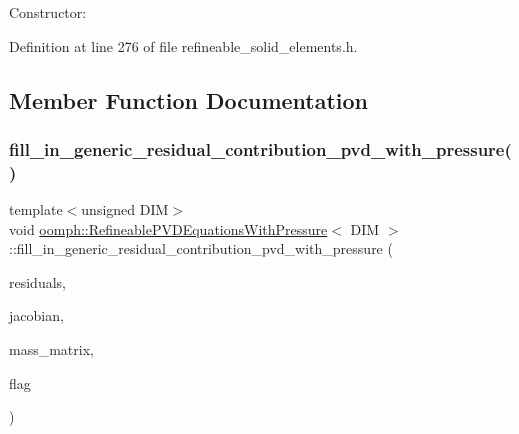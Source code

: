 Constructor\+: 



Definition at line 276 of file refineable\+\_\+solid\+\_\+elements.\+h.



\subsection{Member Function Documentation}
\mbox{\label{classoomph_1_1RefineablePVDEquationsWithPressure_a5772ce11dd9bc9e7bdf0a2463fc753d5}} 
\subsubsection{\texorpdfstring{fill\+\_\+in\+\_\+generic\+\_\+residual\+\_\+contribution\+\_\+pvd\+\_\+with\+\_\+pressure()}{fill\_in\_generic\_residual\_contribution\_pvd\_with\_pressure()}}
{\footnotesize\ttfamily template$<$unsigned D\+IM$>$ \\
void \hyperlink{classoomph_1_1RefineablePVDEquationsWithPressure}{oomph\+::\+Refineable\+P\+V\+D\+Equations\+With\+Pressure}$<$ D\+IM $>$\+::fill\+\_\+in\+\_\+generic\+\_\+residual\+\_\+contribution\+\_\+pvd\+\_\+with\+\_\+pressure (\begin{DoxyParamCaption}\item[{\hyperlink{classoomph_1_1Vector}{Vector}$<$ double $>$ \&}]{residuals,  }\item[{\hyperlink{classoomph_1_1DenseMatrix}{Dense\+Matrix}$<$ double $>$ \&}]{jacobian,  }\item[{\hyperlink{classoomph_1_1DenseMatrix}{Dense\+Matrix}$<$ double $>$ \&}]{mass\+\_\+matrix,  }\item[{const unsigned \&}]{flag }\end{DoxyParamCaption})\hspace{0.3cm}{\ttfamily [virtual]}}



